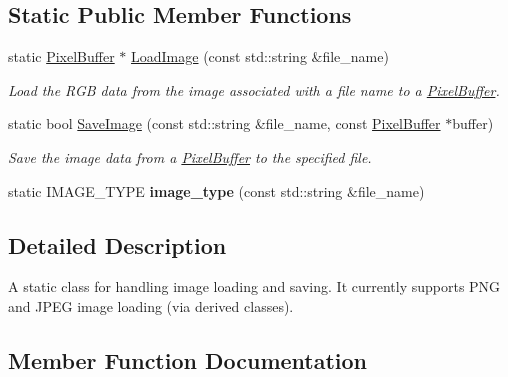 \subsection*{Static Public Member Functions}
\begin{DoxyCompactItemize}
\item 
static \hyperlink{classimage__tools_1_1PixelBuffer}{Pixel\+Buffer} $\ast$ \hyperlink{classimage__tools_1_1ImageHandler_aad1dfd6cf01b3b99f14d5be0f5adad7b}{Load\+Image} (const std\+::string \&file\+\_\+name)
\begin{DoxyCompactList}\small\item\em Load the R\+GB data from the image associated with a file name to a \hyperlink{classimage__tools_1_1PixelBuffer}{Pixel\+Buffer}. \end{DoxyCompactList}\item 
static bool \hyperlink{classimage__tools_1_1ImageHandler_a699e712126c1cd81be7829d277a12fc7}{Save\+Image} (const std\+::string \&file\+\_\+name, const \hyperlink{classimage__tools_1_1PixelBuffer}{Pixel\+Buffer} $\ast$buffer)
\begin{DoxyCompactList}\small\item\em Save the image data from a \hyperlink{classimage__tools_1_1PixelBuffer}{Pixel\+Buffer} to the specified file. \end{DoxyCompactList}\item 
static I\+M\+A\+G\+E\+\_\+\+T\+Y\+PE {\bfseries image\+\_\+type} (const std\+::string \&file\+\_\+name)\hypertarget{classimage__tools_1_1ImageHandler_a581d3d4835efd20091225b67395c105e}{}\label{classimage__tools_1_1ImageHandler_a581d3d4835efd20091225b67395c105e}

\end{DoxyCompactItemize}


\subsection{Detailed Description}
A static class for handling image loading and saving. It currently supports P\+NG and J\+P\+EG image loading (via derived classes). 

\subsection{Member Function Documentation}
